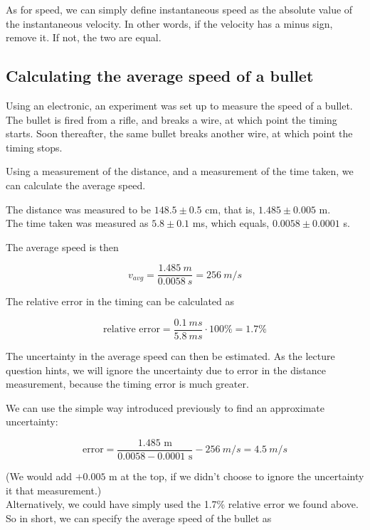 \documentclass[12pt,a4paper]{report}
\begin{document}
As for speed, we can simply define instantaneous speed as the absolute value of the instantaneous velocity. In other words, if the velocity has a minus sign, remove it. If not, the two are equal.

\subsection{Calculating the average speed of a bullet}

Using an electronic, an experiment was set up to measure the speed of a bullet. The bullet is fired from a rifle, and breaks a wire, at which point the timing starts. Soon thereafter, the same bullet breaks another wire, at which point the timing stops.

Using a measurement of the distance, and a measurement of the time taken, we can calculate the average speed.

The distance was measured to be $148.5 \pm 0.5$ cm, that is, $1.485 \pm 0.005$ m.\\
The time taken was measured as $5.8 \pm 0.1$ ms, which equals, $0.0058 \pm 0.0001$ s.

The average speed is then

\begin{equation}
v_{avg} = \frac{\SI{1.485}{m}}{\SI{0.0058}{s}} = \SI{256}{m/s}
\end{equation}

The relative error in the timing can be calculated as 

\begin{equation}
\text{relative error} = \frac{\SI{0.1}{ms}}{\SI{5.8}{ms}} \cdot 100\% = 1.7\% 
\end{equation}

The uncertainty in the average speed can then be estimated. As the lecture question hints, we will ignore the uncertainty due to error in the distance measurement, because the timing error is much greater.

We can use the simple way introduced previously to find an approximate uncertainty:

\begin{equation}
\text{error} = \frac{1.485 \text{ m}}{0.0058 - 0.0001 \text{ s}} - \SI{256}{m/s} = \SI{4.5}{m/s}
\end{equation}

(We would add $+0.005$ m at the top, if we didn't choose to ignore the uncertainty it that measurement.)\\
Alternatively, we could have simply used the 1.7\% relative error we found above.\\
So in short, we can specify the average speed of the bullet as
\end{document}
